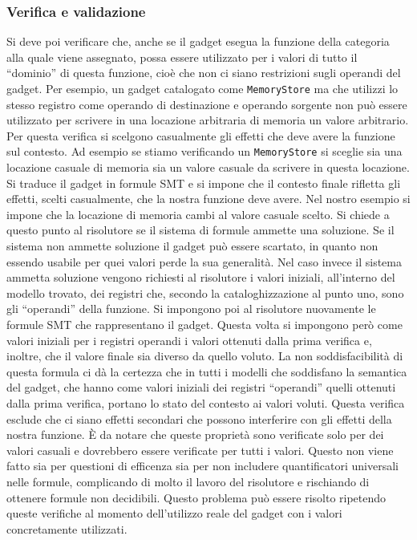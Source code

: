 \subsubsection{Verifica e validazione}
Si deve poi verificare che, anche se il gadget esegua la funzione
della categoria alla quale viene assegnato, possa essere utilizzato
per i valori di tutto il ``dominio'' di questa funzione, cioè che non
ci siano restrizioni sugli operandi del gadget. Per esempio, un gadget
catalogato come \lstinline{MemoryStore} ma che utilizzi lo stesso
registro come operando di destinazione e operando sorgente non può
essere utilizzato per scrivere in una locazione arbitraria di memoria
un valore arbitrario. Per questa verifica si scelgono casualmente gli
effetti che deve avere la funzione sul contesto. Ad esempio se stiamo
verificando un \lstinline{MemoryStore} si sceglie sia una locazione
casuale di memoria sia un valore casuale da scrivere in questa
locazione. Si traduce il gadget in formule SMT e si impone che il
contesto finale rifletta gli effetti, scelti casualmente, che la
nostra funzione deve avere. Nel nostro esempio si impone che la
locazione di memoria cambi al valore casuale scelto. Si chiede a
questo punto al risolutore se il sistema di formule ammette una
soluzione. Se il sistema non ammette soluzione il gadget può essere
scartato, in quanto non essendo usabile per quei valori perde la sua
generalità. Nel caso invece il sistema ammetta soluzione vengono
richiesti al risolutore i valori iniziali, all'interno del modello
trovato, dei registri che, secondo la cataloghizzazione al punto uno,
sono gli ``operandi'' della funzione. Si impongono poi al risolutore
nuovamente le formule SMT che rappresentano il gadget.  Questa volta
si impongono però come valori iniziali per i registri operandi i
valori ottenuti dalla prima verifica e, inoltre, che il valore finale
sia diverso da quello voluto. La non soddisfacibilità di questa
formula ci dà la certezza che in tutti i modelli che soddisfano la
semantica del gadget, che hanno come valori iniziali dei registri
``operandi'' quelli ottenuti dalla prima verifica, portano lo stato
del contesto ai valori voluti. Questa verifica esclude che ci siano
effetti secondari che possono interferire con gli effetti della nostra
funzione. È da notare che queste proprietà sono verificate solo per
dei valori casuali e dovrebbero essere verificate per tutti i
valori. Questo non viene fatto sia per questioni di efficenza sia per
non includere quantificatori universali nelle formule, complicando di
molto il lavoro del risolutore e rischiando di ottenere formule non
decidibili. Questo problema può essere risolto ripetendo queste
verifiche al momento dell'utilizzo reale del gadget con i valori
concretamente utilizzati.

